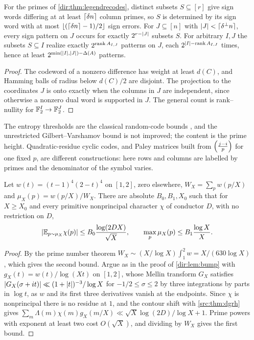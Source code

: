 \begin{corollary}\label{dir:cor:legendre}
For the primes of \cref{dir:thm:legendrecodes}, distinct subsets $S\subseteq[r]$ give sign words differing at
at least $\lceil\delta n\rceil$ column primes, so $S$ is determined by its sign word with at most
$\lfloor(\lceil\delta n\rceil-1)/2\rfloor$ sign errors. For $J\subseteq[n]$ with $\lvert J\rvert<\lceil\delta^\perp n\rceil$, every sign pattern
on $J$ occurs for exactly $2^{r-\lvert J\rvert}$ subsets $S$. For arbitrary $I,J$ the subsets $S\subseteq I$ realize exactly
$2^{\operatorname{rank} A_{I,J}}$ patterns on $J$, each $2^{\lvert I\rvert-\operatorname{rank} A_{I,J}}$ times, hence at least
$2^{\min(\lvert I\rvert,\lvert J\rvert)-\Delta(A)}$ patterns.
\end{corollary}

\begin{proof}
The codeword of a nonzero difference has weight at least $d(C)$, and Hamming balls of radius below
$d(C)/2$ are disjoint. The projection to the coordinates $J$ is onto exactly when the columns in $J$ are
independent, since otherwise a nonzero dual word is supported in $J$. The general count is rank--nullity for
$\mathbb{F}_2^I\to\mathbb{F}_2^J$.
\end{proof}

The entropy thresholds are the classical random-code bounds \cite{GuruswamiRudraSudan2022Essential}, and the
unrestricted Gilbert--Varshamov bound is not improved; the content is the prime height. Quadratic-residue cyclic
codes, and Paley matrices built from $\Bigl(\frac{j-i}{p}\Bigr)$ for one fixed $p$, are different constructions: here rows
and columns are labelled by primes and the denominator of the symbol varies.

\begin{lemma}\label{dir:lem:window}
Let $w(t)=(t-1)^4(2-t)^4$ on $[1,2]$, zero elsewhere, $W_X=\sum_pw(p/X)$ and $\mu_X(p)=w(p/X)/W_X$. There are
absolute $B_0,B_1,X_0$ such that for $X\ge X_0$ and every primitive nonprincipal character $\chi$ of conductor
$D$, with no restriction on $D$,
\[
 \lvert\mathbb{E}_{p\sim\mu_X}\chi(p)\rvert\le B_0\frac{\log(2DX)}{\sqrt X},\qquad\max_p\mu_X(p)\le B_1\frac{\log X}X .
\]
\end{lemma}

\begin{proof}
By the prime number theorem $W_X\sim(X/\log X)\int_1^2w=X/(630\log X)$, which gives the second bound. Argue as
in the proof of \cref{dir:lem:bump} with $g_X(t)=w(t)/\log(Xt)$ on $[1,2]$, whose Mellin transform $G_X$ satisfies
$\lvert G_X(\sigma+it)\rvert\ll(1+\lvert t\rvert)^{-3}/\log X$ for $-1/2\le\sigma\le2$ by three integrations by parts in $\log t$, as $w$
and its first three derivatives vanish at the endpoints. Since $\chi$ is nonprincipal there is no residue at $1$,
and the contour shift with \cref{src:thm:dgrh} gives $\sum_m\Lambda(m)\chi(m)g_X(m/X)\ll\sqrt X\log(2D)/\log X+1$. Prime
powers with exponent at least two cost $O(\sqrt X)$, and dividing by $W_X$ gives the first bound.
\end{proof}

